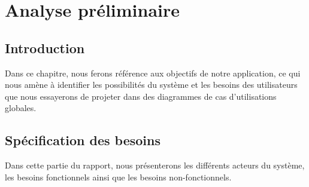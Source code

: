 \chapter{Analyse préliminaire}

\section*{Introduction}
Dans ce chapitre, nous ferons référence aux objectifs de notre application, ce qui nous amène à identifier les possibilités du système et les besoins des utilisateurs que nous essayerons de projeter dans des diagrammes de cas d’utilisations globales.
    
\section[Spécification des besoins]{Spécification des besoins}
Dans cette partie du rapport, nous présenterons les différents acteurs du système, les besoins fonctionnels ainsi que les besoins non-fonctionnels.
